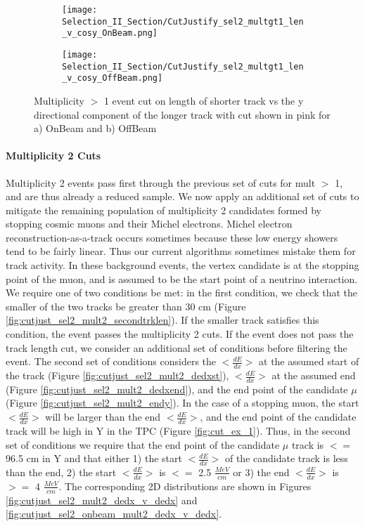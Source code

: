 \begin{figure}[t!]
\centering
  \begin{subfigure}[t]{0.25\textwidth}
    \centering
\texttt{[image: Selection\_II\_Section/CutJustify\_sel2\_multgt1\_len\_v\_cosy\_OnBeam.png]}
 \caption{ }
  \end{subfigure} 
  \hspace{20mm}
  \begin{subfigure}[t]{0.25\textwidth}
    \centering
  \texttt{[image: Selection\_II\_Section/CutJustify\_sel2\_multgt1\_len\_v\_cosy\_OffBeam.png]}
   \caption{ }
  \end{subfigure} 
\caption{ Multiplicity $>$ 1 event cut on length of shorter track vs the y directional component of the longer track with cut shown in pink for a) OnBeam and b) OffBeam }
\label{fig:cutjust_sel2_onbeam_multgt1_len_v_cosy}
\end{figure}

\clearpage
\paragraph{Multiplicity 2 Cuts}
Multiplicity 2 events pass first through the previous set of cuts for mult $>$ 1, and are thus already a reduced sample. We now apply an additional set of cuts to mitigate the remaining population of multiplicity 2 candidates formed by stopping cosmic muons and their Michel electrons. Michel electron reconstruction-as-a-track occurs sometimes because these low energy showers tend to be fairly linear.  Thus our current algorithms sometimes mistake them for track activity.  In these background events, the vertex candidate is at the stopping point of the muon, and is assumed to be the start point of a neutrino interaction. We require one of two conditions be met: in the first condition, we check that the smaller of the two tracks be greater than 30 cm (Figure \ref{fig:cutjust_sel2_mult2_secondtrklen}). If the smaller track satisfies this condition, the event passes the multiplicity 2 cuts. If the event does not pass the track length cut, we consider an additional set of conditions before filtering the event.  The second set of conditions considers the $<\frac{dE}{dx}>$ at the assumed start of the track (Figure \ref{fig:cutjust_sel2_mult2_dedxst}), $<\frac{dE}{dx}>$ at the assumed end (Figure \ref{fig:cutjust_sel2_mult2_dedxend}), and the end point of the candidate $\mu$ (Figure \ref{fig:cutjust_sel2_mult2_endy}).  In the case of a stopping muon, the start $<\frac{dE}{dx}>$ will be larger than the end $<\frac{dE}{dx}>$, and the end point of the candidate track will be high in Y in the TPC (Figure \ref{fig:cut_ex_1}).  Thus, in the second set of conditions we require that the end point of the candidate $\mu$ track is $<=$ 96.5 cm in Y and that either 1) the start $<\frac{dE}{dx}>$ of the candidate track is less than the end, 2) the start $<\frac{dE}{dx}>$ is $<=$ 2.5 $\frac{MeV}{cm}$ or 3) the end $<\frac{dE}{dx}>$ is $>=$ 4 $\frac{MeV}{cm}$. The corresponding 2D distributions are shown in Figures \ref{fig:cutjust_sel2_mult2_dedx_v_dedx} and \ref{fig:cutjust_sel2_onbeam_mult2_dedx_v_dedx}.

